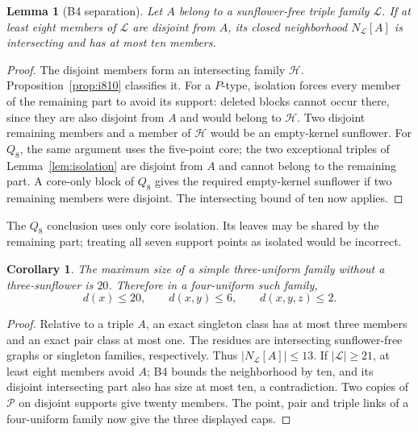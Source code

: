 \documentclass[11pt,a4paper]{article}
\numberwithin{equation}{section}
\newtheorem{lemma}[theorem]{Lemma}
\newtheorem{corollary}[theorem]{Corollary}
\theoremstyle{remark}
\renewcommand{\L}{\mathcal L}
\newcommand{\Pten}{\mathcal P}
\begin{document}
\begin{lemma}[B4 separation]
\label{lem:b4}
Let $ A $ belong to a sunflower-free triple family $\L $. If at least
eight members of $\L $ are disjoint from $ A $, its closed neighborhood
$ N_{\L}[A]$ is intersecting and has at most ten members.
\end{lemma}
\begin{proof}
The disjoint members form an intersecting family $\mathcal H $.
Proposition~\ref{prop:i810} classifies it. For a $ P $-type, isolation
forces every member of the remaining part to avoid its support:
deleted blocks cannot occur there, since they are also disjoint
from $ A $ and would belong to $\mathcal H $. Two disjoint remaining
members and a member of $\mathcal H $ would be an empty-kernel
sunflower. For $ Q_8$, the same argument uses the five-point core;
the two exceptional triples of Lemma~\ref{lem:isolation} are
disjoint from $ A $ and cannot belong to the remaining part. A
core-only block of $ Q_8$ gives the required empty-kernel sunflower
if two remaining members were disjoint. The intersecting bound
of ten now applies.
\end{proof}

The $ Q_8$ conclusion uses only core isolation. Its leaves may be
shared by the remaining part; treating all seven support points
as isolated would be incorrect.

\begin{corollary}
\label{cor:triple20}
The maximum size of a simple three-uniform family without a
three-sunflower is $20$. Therefore in a four-uniform such family,
\[
 d(x)\le 20,\qquad d(x,y)\le 6,\qquad d(x,y,z)\le 2.
\]
\end{corollary}
\begin{proof}
Relative to a triple $ A $, an exact singleton class has at most
three members and an exact pair class at most one. The residues
are intersecting sunflower-free graphs or singleton families,
respectively. Thus $|N_{\L}[A]|\le 13$. If $|\L|\ge 21$, at least
eight members avoid $ A $; B4 bounds the neighborhood by ten, and
its disjoint intersecting part also has size at most ten, a
contradiction. Two copies of $\Pten $ on disjoint supports give
twenty members. The point, pair and triple links of a four-uniform
family now give the three displayed caps.
\end{proof}
\end{document}
